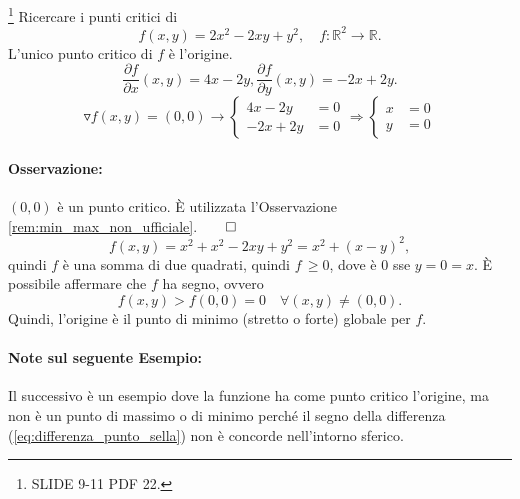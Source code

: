 \begin{example}\label{ex:riferimento_test_hessiana}
	\footnote{SLIDE 9-11 PDF 22.} Ricercare i punti critici di
	\begin{equation*}
		f(x,y) = 2x^2 - 2xy + y^2, \quad f:\mathbb{R}^2\rightarrow\mathbb{R}.
	\end{equation*}
	L'unico punto critico di $f$ è l'origine.
	\begin{equation*}
		\frac{\partial f}{\partial x}(x, y) = 4x - 2y, \frac{\partial f}{\partial y}(x, y) = -2x + 2y. 
	\end{equation*}
	\begin{equation*}
		\triangledown f(x,y) = (0,0) \rightarrow 
		\begin{cases}
			4x - 2y &= 0\\
			-2x + 2y &= 0
		\end{cases}\Rightarrow
		\begin{cases}
			x &= 0\\
			y &= 0
		\end{cases}
	\end{equation*}
	\paragraph{Osservazione:} $(0,0)$ è un punto critico. È utilizzata l'Osservazione \ref{rem:min_max_non_ufficiale}.$\qed$
	\begin{equation*}
		f(x,y) = x^2 + x^2 - 2xy + y^2 = x^2 + (x-y)^2,
	\end{equation*}
	quindi $f$ è una somma di due quadrati, quindi $f \, \geq 0$, dove è 0 sse $y = 0 = x$.
	È possibile affermare che $f$ ha segno, ovvero
	\begin{equation*}
		f(x,y) > f(0,0) = 0 \quad \forall(x,y) \neq (0,0).
	\end{equation*}
	Quindi, l'origine è il punto di minimo (stretto o forte) globale per $f$.
\end{example}

\paragraph{Note sul seguente Esempio:} Il successivo è un esempio dove la funzione ha come punto critico l'origine, ma non è un punto di massimo o di minimo perché il segno della differenza (\ref{eq:differenza_punto_sella}) non è concorde nell'intorno sferico.

